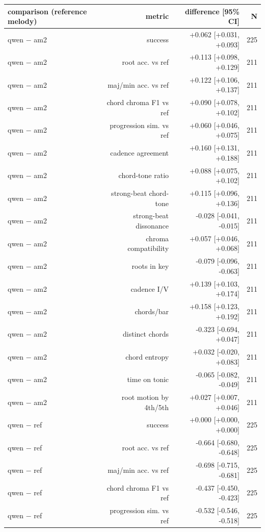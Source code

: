 \begin{table}[t]
\centering
\small
\begin{tabular}{lrrr}
\toprule
comparison (reference melody) & metric & difference [95\% CI] & N \\
\midrule
qwen $-$ am2 & success & +0.062 [+0.031, +0.093] & 225 \\
qwen $-$ am2 & root acc. vs ref & +0.113 [+0.098, +0.129] & 211 \\
qwen $-$ am2 & maj/min acc. vs ref & +0.122 [+0.106, +0.137] & 211 \\
qwen $-$ am2 & chord chroma F1 vs ref & +0.090 [+0.078, +0.102] & 211 \\
qwen $-$ am2 & progression sim. vs ref & +0.060 [+0.046, +0.075] & 211 \\
qwen $-$ am2 & cadence agreement & +0.160 [+0.131, +0.188] & 211 \\
qwen $-$ am2 & chord-tone ratio & +0.088 [+0.075, +0.102] & 211 \\
qwen $-$ am2 & strong-beat chord-tone & +0.115 [+0.096, +0.136] & 211 \\
qwen $-$ am2 & strong-beat dissonance & -0.028 [-0.041, -0.015] & 211 \\
qwen $-$ am2 & chroma compatibility & +0.057 [+0.046, +0.068] & 211 \\
qwen $-$ am2 & roots in key & -0.079 [-0.096, -0.063] & 211 \\
qwen $-$ am2 & cadence I/V & +0.139 [+0.103, +0.174] & 211 \\
qwen $-$ am2 & chords/bar & +0.158 [+0.123, +0.192] & 211 \\
qwen $-$ am2 & distinct chords & -0.323 [-0.694, +0.047] & 211 \\
qwen $-$ am2 & chord entropy & +0.032 [-0.020, +0.083] & 211 \\
qwen $-$ am2 & time on tonic & -0.065 [-0.082, -0.049] & 211 \\
qwen $-$ am2 & root motion by 4th/5th & +0.027 [+0.007, +0.046] & 211 \\
qwen $-$ ref & success & +0.000 [+0.000, +0.000] & 225 \\
qwen $-$ ref & root acc. vs ref & -0.664 [-0.680, -0.648] & 225 \\
qwen $-$ ref & maj/min acc. vs ref & -0.698 [-0.715, -0.681] & 225 \\
qwen $-$ ref & chord chroma F1 vs ref & -0.437 [-0.450, -0.423] & 225 \\
qwen $-$ ref & progression sim. vs ref & -0.532 [-0.546, -0.518] & 225 \\

\end{tabular}
\end{table}
